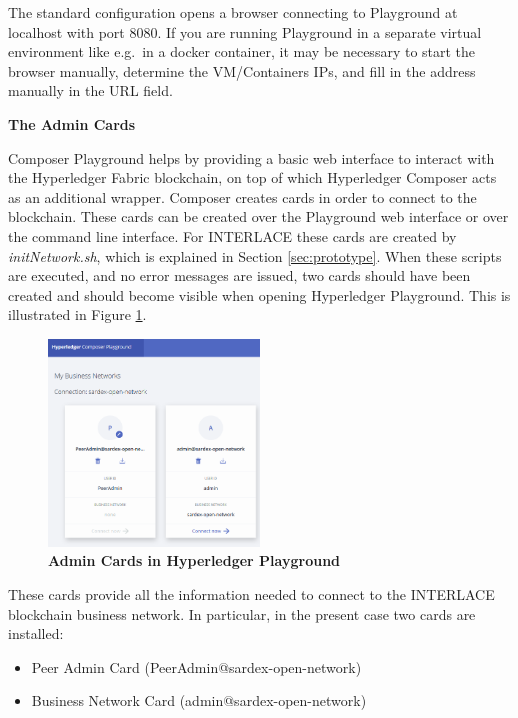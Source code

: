 The standard configuration opens a browser connecting to Playground at localhost with port 8080. If you are running Playground in a separate virtual environment like e.g.\ in a docker container, it may be necessary to start the browser manually, determine the VM/Containers IPs, and fill in the address manually in the URL field.

\textbf{The Admin Cards}

Composer Playground helps by providing a basic web interface to interact with the Hyperledger Fabric blockchain, on top of which Hyperledger Composer acts as an additional wrapper. Composer creates cards in order to connect to the blockchain. These cards can be created over the Playground web interface or over the command line interface. For INTERLACE these cards are created by \textit{initNetwork.sh}, which is explained in Section \ref{sec:prototype}. When these scripts are executed, and no error messages are issued, two cards should have been created and should become visible when opening Hyperledger Playground. This is illustrated in Figure \ref{fig:admin-cards}.

\begin{figure}[htbp]
  \centering
  \includegraphics[width=0.5\textwidth]{Figures/admin-cards}
  \caption{\bf\small Admin Cards in Hyperledger Playground}
  \label{fig:admin-cards}
\end{figure}

These cards provide all the information needed to connect to the INTERLACE blockchain business network. In particular, in the present case two cards are installed:

\begin{itemize}
	\item Peer Admin Card (PeerAdmin@sardex-open-network)
	\item Business Network Card (admin@sardex-open-network)
\end{itemize}

